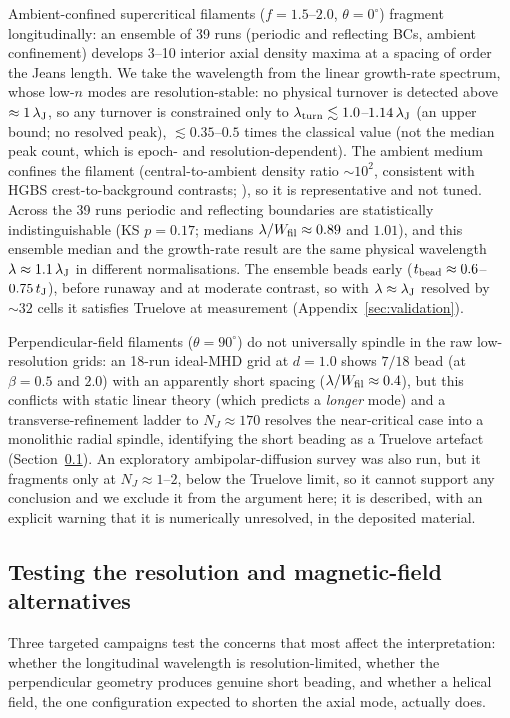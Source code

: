 \documentclass[usenatbib,twoside,twocolumn]{mnras}
\begin{document}
Ambient-confined supercritical filaments ($f=1.5$--$2.0$, $\theta=0^\circ$) fragment longitudinally: an ensemble of 39 runs (periodic and reflecting BCs, ambient confinement) develops 3--10 interior axial density maxima at a spacing of order the Jeans length. We take the wavelength from the linear growth-rate spectrum, whose low-$n$ modes are resolution-stable: no physical turnover is detected above $\approx1\,\lambda_{\rm J}$, so any turnover is constrained only to $\lambda_{\rm turn}\lesssim1.0$--$1.14\,\lambda_{\rm J}$ (an upper bound; no resolved peak), $\lesssim0.35$--$0.5$ times the classical value (not the median peak count, which is epoch- and resolution-dependent). The ambient medium confines the filament (central-to-ambient density ratio $\sim10^2$, consistent with HGBS crest-to-background contrasts; \citealt{Arzoumanian2019}), so it is representative  and not tuned. Across the 39 runs periodic and reflecting boundaries are statistically indistinguishable (KS $p=0.17$; medians $\lambda/W_{\rm fil}\approx0.89$ and $1.01$), and this ensemble median and the growth-rate result are the same physical wavelength $\lambda\approx1.1\,\lambda_{\rm J}$ in different normalisations. The ensemble beads early ($t_{\rm bead}\approx0.6$--$0.75\,t_{\rm J}$), before runaway and at moderate contrast, so with $\lambda\approx\lambda_{\rm J}$ resolved by ${\sim}32$ cells it satisfies Truelove at measurement (Appendix~\ref{sec:validation}).

Perpendicular-field filaments ($\theta=90^\circ$) do not universally spindle in the raw low-resolution grids: an 18-run ideal-MHD grid at $d=1.0$ shows $7/18$ bead (at $\beta=0.5$ and $2.0$) with an apparently short spacing ($\lambda/W_{\rm fil}\approx0.4$), but this conflicts with static linear theory (which predicts a \emph{longer} mode) and a transverse-refinement ladder to $N_J\approx170$ resolves the near-critical case into a monolithic radial spindle, identifying the short beading as a Truelove artefact (Section~\ref{sec:optional_tests}). An exploratory ambipolar-diffusion survey was also run, but it fragments only at $N_J\approx1$--$2$, below the Truelove limit, so it cannot support any conclusion and we exclude it from the argument here; it is described, with an explicit warning that it is numerically unresolved, in the deposited material.

\subsection{Testing the resolution and magnetic-field alternatives}
\label{sec:optional_tests}
Three targeted campaigns test the concerns that most affect the interpretation: whether the longitudinal wavelength is resolution-limited, whether the perpendicular geometry produces genuine short beading, and whether a helical field, the one configuration expected to shorten the axial mode, actually does.
\end{document}
